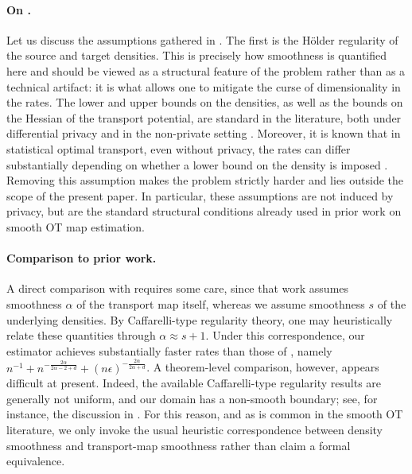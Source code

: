 \documentclass{article}
\newcommand{\1}{\mathds{1}}
\theoremstyle{plain}
\theoremstyle{definition}
\theoremstyle{remark}
\begin{document}
\paragraph{On .}
Let us discuss the assumptions gathered in . The first is the Hölder regularity of the source and target densities. This is precisely how smoothness is quantified here and should be viewed as a structural feature of the problem rather than as a technical artifact: it is what allows one to mitigate the curse of dimensionality in the rates. The lower and upper bounds on the densities, as well as the bounds on the Hessian of the transport potential, are standard in the literature, both under differential privacy \cite{lalanne2025PrivateOTMaps} and in the non-private setting \cite{hutter2021minimax,Manole2024Plugin}. Moreover, it is known that in statistical optimal transport, even without privacy, the rates can differ substantially depending on whether a lower bound on the density is imposed \cite{NilesWeed2019Minimax}. Removing this assumption makes the problem strictly harder and lies outside the scope of the present paper. In particular, these assumptions are not induced by privacy, but are the standard structural conditions already used in prior work on smooth OT map estimation.

\paragraph{Comparison to prior work.}
A direct comparison with \cite{lalanne2025PrivateOTMaps} requires some care, since that work assumes smoothness $\alpha$ of the transport map itself, whereas we assume smoothness $s$ of the underlying densities. By Caffarelli-type regularity theory, one may heuristically relate these quantities through $\alpha \approx s+1$. Under this correspondence, our estimator achieves substantially faster rates than those of \cite{lalanne2025PrivateOTMaps}, namely
$
n^{-1}
+
n^{-\frac{2\alpha}{2\alpha-2+d}}
+
(n\epsilon)^{-\frac{2\alpha}{2\alpha+d}}
$.
A theorem-level comparison, however, appears difficult at present. Indeed, the available Caffarelli-type regularity results are generally not uniform, and our domain has a non-smooth boundary; see, for instance, the discussion in \cite{Manole2024Plugin}. For this reason, and as is common in the smooth OT literature, we only invoke the usual heuristic correspondence between density smoothness and transport-map smoothness rather than claim a formal equivalence.
\end{document}
